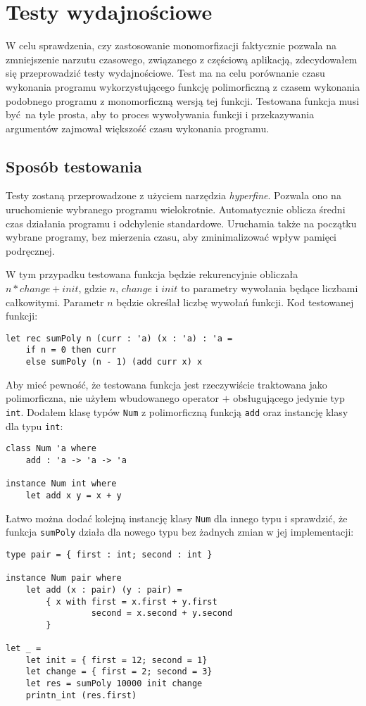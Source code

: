 \documentclass[declaration,shortabstract]{iithesis}
\begin{document}


\chapter{Testy wydajnościowe}

W celu sprawdzenia, czy zastosowanie monomorfizacji faktycznie pozwala na 
zmniejszenie narzutu czasowego, związanego z częściową aplikacją, zdecydowałem 
się przeprowadzić testy wydajnościowe. Test ma na celu porównanie czasu wykonania 
programu wykorzystującego funkcję polimorficzną z czasem wykonania 
podobnego programu z monomorficzną wersją tej funkcji. Testowana funkcja musi 
być na tyle prosta, aby to proces wywoływania funkcji i przekazywania 
argumentów zajmował większość czasu wykonania programu. 

\section{Sposób testowania}
Testy zostaną przeprowadzone z użyciem narzędzia \textit{hyperfine}\cite{hyperfine}. 
Pozwala ono na uruchomienie wybranego programu wielokrotnie. 
Automatycznie oblicza średni czas działania programu i odchylenie standardowe.
Uruchamia także na początku wybrane programy, bez mierzenia czasu, aby zminimalizować 
wpływ pamięci podręcznej.

W tym przypadku testowana 
funkcja będzie rekurencyjnie obliczała $n * change + init$, gdzie $n$, $change$ i $init$ 
to parametry wywołania będące liczbami całkowitymi. Parametr $n$ będzie określał 
liczbę wywołań funkcji. Kod testowanej funkcji:
\begin{lstlisting}[frame=lines]
let rec sumPoly n (curr : 'a) (x : 'a) : 'a = 
    if n = 0 then curr 
    else sumPoly (n - 1) (add curr x) x 
\end{lstlisting}
Aby mieć pewność, że testowana funkcja jest rzeczywiście traktowana jako 
polimorficzna, nie użyłem wbudowanego operator $+$ obsługującego jedynie typ 
\texttt{int}. Dodałem klasę typów \texttt{Num} z polimorficzną funkcją 
\texttt{add} oraz instancję klasy dla typu \texttt{int}:
\begin{lstlisting}[frame=lines]
class Num 'a where 
    add : 'a -> 'a -> 'a 

instance Num int where 
    let add x y = x + y 
\end{lstlisting}
Łatwo można dodać kolejną instancję klasy \texttt{Num} dla innego typu i sprawdzić, 
że funkcja \texttt{sumPoly} działa dla nowego typu bez żadnych zmian w jej 
implementacji:
\begin{lstlisting}[frame=lines]
type pair = { first : int; second : int }

instance Num pair where 
    let add (x : pair) (y : pair) = 
        { x with first = x.first + y.first
                 second = x.second + y.second
        }

let _ = 
    let init = { first = 12; second = 1}
    let change = { first = 2; second = 3} 
    let res = sumPoly 10000 init change 
    printn_int (res.first) 
\end{lstlisting}
\end{document}
